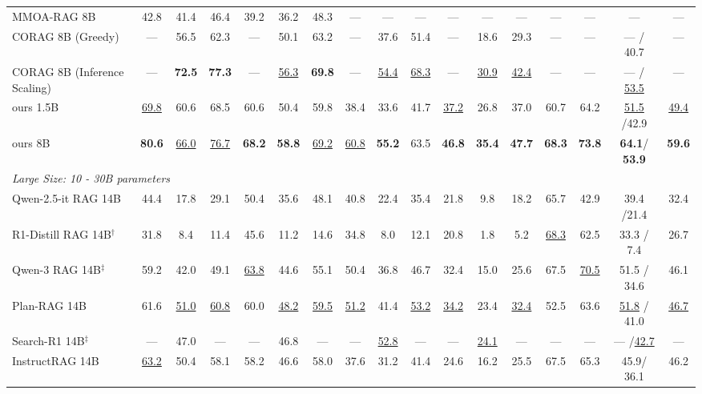 \begin{table}[t]
{\begin{tabular}{l @{\hskip2.5pt} | c c c | c c c | c c c | c c c | c | c @{\hskip3.5pt}| c @{\hskip6pt} c}
MMOA-RAG 8B~\citep{chen2025improving} & 42.8& 41.4& 46.4& 39.2& 36.2& 48.3&--- & --- & ---&--- & --- & ---&--- & --- & --- & ---  \\
CORAG 8B (Greedy)~\cite{wang2025chain} & --- &56.5&62.3&---&50.1&63.2&---&37.6&51.4&---&18.6&29.3&---&---&--- / 40.7&---\\
CORAG 8B (Inference Scaling)~\cite{wang2025chain} & ---&\textbf{72.5}&\textbf{77.3}&---&\underline{56.3}&\textbf{69.8}&---&\underline{54.4}&\underline{68.3}&---&\underline{30.9}&\underline{42.4}&---&---&--- /
\underline{53.5}&--- \\
\rowcolor{magenta!12} ours 1.5B & \underline{69.8} &60.6&68.5&60.6&50.4&59.8&38.4&33.6&41.7&\underline{37.2}&26.8&37.0&60.7&64.2&\underline{51.5} /42.9&\underline{49.4}\\
\rowcolor{magenta!12} ours 8B & \textbf{80.6} &\underline{66.0}&\underline{76.7}&\textbf{68.2}&\textbf{58.8}&\underline{69.2}&\underline{60.8}&\textbf{55.2}&63.5&\textbf{46.8}&\textbf{35.4}&\textbf{47.7}&\textbf{68.3}&\textbf{73.8}&\textbf{64.1}/ \textbf{53.9}&\textbf{59.6}\\
\midrule
\multicolumn{10}{l}{\textit{Large Size: 10 - 30B parameters}}  \\
\midrule
Qwen-2.5-it RAG 14B~\citep{yang2024qwen2} & 44.4&17.8&29.1&50.4&35.6&48.1&40.8&22.4&35.4&21.8&9.8&18.2&65.7&42.9 &39.4 /21.4&32.4 \\
R1-Distill RAG 14B$^\dagger$~\citep{guo2025deepseek}& 31.8 &8.4 &11.4 &45.6 &11.2 &14.6 &34.8 &8.0 &12.1 &20.8 &1.8 &5.2 &\underline{68.3} &62.5 &33.3 / 7.4 &26.7  \\
Qwen-3 RAG 14B$^\ddagger$~\citep{qwen3} & 59.2 &42.0 &49.1 &\underline{63.8} &44.6 &55.1 &50.4 &36.8 &46.7 &32.4 &15.0 &25.6 &67.5 &\underline{70.5} &51.5 / 34.6 & 46.1 \\
Plan-RAG 14B~\citep{verma2025planrag}& 61.6 &\underline{51.0} &\underline{60.8} &60.0 &\underline{48.2} &\underline{59.5} &\underline{51.2} &41.4 &\underline{53.2} &\underline{34.2} &23.4 &\underline{32.4} &52.5&63.6 &\underline{51.8} / 41.0 &\underline{46.7} \\
Search-R1 14B$^\ddagger$~\citep{jin2025searchr1} & ---&47.0 &--- &--- &46.8 &--- &--- &\underline{52.8} &--- &--- &\underline{24.1} &--- &--- &--- &--- /\underline{42.7} &--- \\
InstructRAG 14B~\citep{wei2025instructrag} & \underline{63.2} &50.4 &58.1 &58.2 &46.6 &58.0 &37.6 &31.2 &41.4 &24.6 &16.2 &25.5 &67.5 &65.3 &45.9/ 36.1 &46.2 \\

\end{tabular}}
\end{table}
